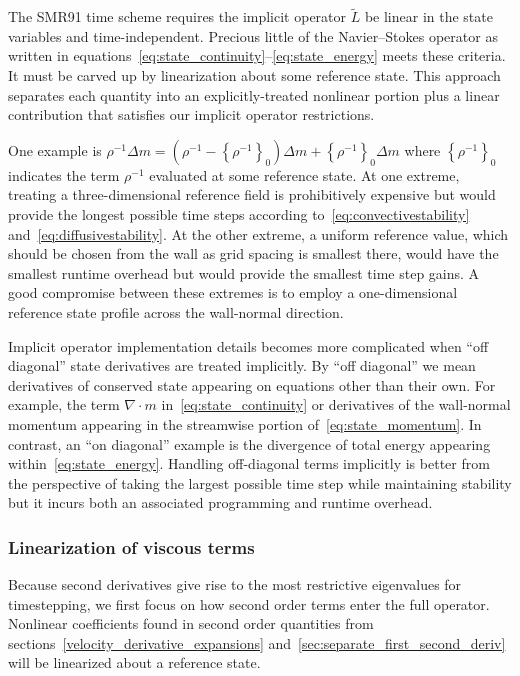 \documentclass[letterpaper,11pt,nointlimits,reqno,draft]{amsart}
\newcommand{\reference}[1]{\ensuremath{\left\{#1\right\}_{0}}}
\newcommand{\lessreference}[1]
  {\ensuremath{\left({#1}-\reference{#1}\right)}}
\begin{document}
The SMR91 time scheme requires the implicit operator $\tilde{L}$ be linear in
the state variables and time-independent.  Precious little of the
Navier--Stokes operator as written in
equations~\eqref{eq:state_continuity}--\eqref{eq:state_energy} meets these
criteria.  It must be carved up by linearization about some reference state.
This approach separates each quantity into an explicitly-treated nonlinear
portion plus a linear contribution that satisfies our implicit operator
restrictions.

One example is $\rho^{-1}\Delta{}m = \lessreference{\rho^{-1}}\Delta{}m +
\reference{\rho^{-1}}\Delta{}m$ where $\reference{\rho^{-1}}$ indicates the
term $\rho^{-1}$ evaluated at some reference state.  At one extreme, treating a
three-dimensional reference field is prohibitively expensive but would provide
the longest possible time steps according to~\eqref{eq:convectivestability}
and~\eqref{eq:diffusivestability}.  At the other extreme, a uniform reference
value, which should be chosen from the wall as grid spacing is smallest there,
would have the smallest runtime overhead but would provide the smallest time
step gains.  A good compromise between these extremes is to employ a
one-dimensional reference state profile across the wall-normal direction.

Implicit operator implementation details becomes more complicated when ``off
diagonal'' state derivatives are treated implicitly.  By ``off diagonal'' we
mean derivatives of conserved state appearing on equations other than their
own.  For example, the term $\nabla\cdot{}m$ in~\eqref{eq:state_continuity} or
derivatives of the wall-normal momentum appearing in the streamwise portion
of~\eqref{eq:state_momentum}.  In contrast, an ``on diagonal'' example is the
divergence of total energy appearing within~\eqref{eq:state_energy}.  Handling
off-diagonal terms implicitly is better from the perspective of taking the
largest possible time step while maintaining stability but it incurs both an
associated programming and runtime overhead.

\subsubsection{Linearization of viscous terms}

Because second derivatives give rise to the most restrictive eigenvalues for
timestepping, we first focus on how second order terms enter the full operator.
Nonlinear coefficients found in second order quantities from
sections~\ref{velocity_derivative_expansions}
and~\ref{sec:separate_first_second_deriv} will be linearized about a reference
state.
\end{document}
